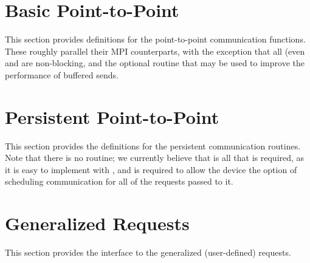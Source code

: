 \documentclass{article}
\begin{document}
\section{Basic Point-to-Point}
\label{sec:pt-2-pt}
This section provides definitions for the point-to-point communication
functions.  These roughly parallel their MPI counterparts, with the 
exception that all (even  and  are
non-blocking, and the optional  routine that may be
used to improve the performance of buffered sends.
















\section{Persistent Point-to-Point}
\label{sec:persistent}
This section provides the definitions for the persistent communication
routines.  Note that there is no  routine; we
currently believe that  is all that is required,
as it is easy to implement  with ,
and  is required to allow the device the option of
scheduling communication for all of the requests passed to it.







\section{Generalized Requests}
\label{sec:grequests}
This section provides the interface to the generalized (user-defined)
requests.  

%

\end{document}
